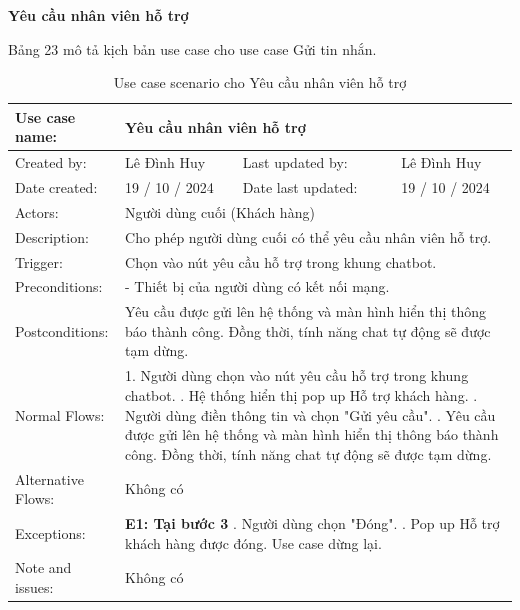 \textbf{Yêu cầu nhân viên hỗ trợ}

Bảng 23 mô tả kịch bản use case cho use case Gửi tin nhắn.

\begin{table}[H]
    \centering
    \begin{tabular}{|l|l|l|l|} 
        \hline
        Use case name: & \multicolumn{3}{|l|}{Yêu cầu nhân viên hỗ trợ} \\
        \hline
        Created by: & Lê Đình Huy & Last updated by: & Lê Đình Huy \\
        \hline
        Date created: & 19 / 10 / 2024 & Date last updated: & 19 / 10 / 2024 \\
        \hline
        Actors: & \multicolumn{3}{|l|}{Người dùng cuối (Khách hàng)} \\
        \hline
        Description: & \multicolumn{3}{|p{12cm}|}{Cho phép người dùng cuối có thể yêu cầu nhân viên hỗ trợ.} \\ 
        \hline
        Trigger: & \multicolumn{3}{|p{12cm}|}{Chọn vào nút yêu cầu hỗ trợ trong khung chatbot.} \\
        \hline
        Preconditions: & \multicolumn{3}{|p{12cm}|}{- Thiết bị của người dùng có kết nối mạng.} \\
        \hline
        Postconditions: & \multicolumn{3}{|p{12cm}|}{Yêu cầu được gửi lên hệ thống và màn hình hiển thị thông báo thành công. Đồng thời, tính năng chat tự động sẽ được tạm dừng.} \\
        \hline
        Normal Flows: & \multicolumn{3}{|p{12cm}|}{1. Người dùng chọn vào nút yêu cầu hỗ trợ trong khung chatbot. \newline
        2. Hệ thống hiển thị pop up Hỗ trợ khách hàng. \newline
        3. Người dùng điền thông tin và chọn "Gửi yêu cầu". \newline
        4. Yêu cầu được gửi lên hệ thống và màn hình hiển thị thông báo thành công. Đồng thời, tính năng chat tự động sẽ được tạm dừng.} \\
        \hline
        Alternative Flows: & \multicolumn{3}{|p{12cm}|}{Không có} \\
        \hline
        Exceptions: & \multicolumn{3}{|p{12cm}|}{
        \textbf{E1: Tại bước 3} \newline
        3.1. Người dùng chọn "Đóng". \newline
        3.2. Pop up Hỗ trợ khách hàng được đóng. \newline
        Use case dừng lại.} \\
        \hline
        Note and issues: & \multicolumn{3}{|p{12cm}|}{Không có} \\
        \hline
    \end{tabular}
    \caption{Use case scenario cho Yêu cầu nhân viên hỗ trợ}
\end{table}


